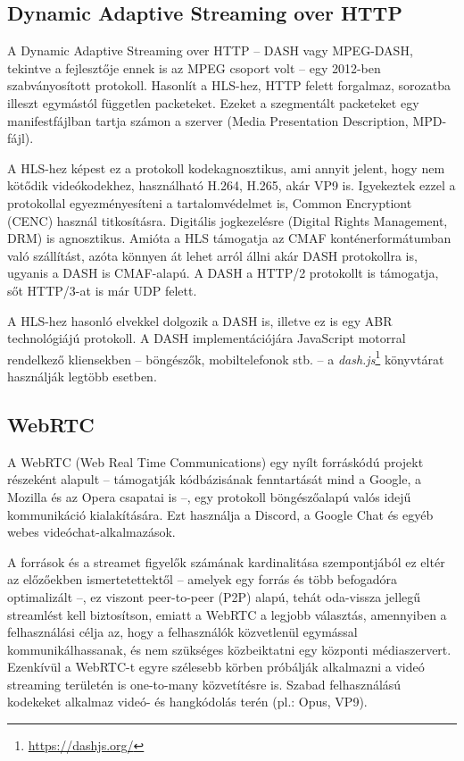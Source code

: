 \subsection{Dynamic Adaptive Streaming over HTTP}

A Dynamic Adaptive Streaming over HTTP -- DASH vagy MPEG-DASH, tekintve a fejlesztője ennek is az MPEG csoport volt -- egy 2012-ben szabványosított protokoll. Hasonlít a HLS-hez, HTTP felett forgalmaz, sorozatba illeszt egymástól független packeteket. Ezeket a szegmentált packeteket egy manifestfájlban tartja számon a szerver (Media Presentation Description, MPD-fájl). \cite{Dash}

A HLS-hez képest ez a protokoll kodekagnosztikus, ami annyit jelent, hogy nem kötődik videókodekhez, használható H.264, H.265, akár VP9 is. \cite{DashIso} Igyekeztek ezzel a protokollal egyezményesíteni a tartalomvédelmet is, Common Encryptiont (CENC) használ titkosításra. Digitális jogkezelésre (Digital Rights Management, DRM) is agnosztikus. Amióta a HLS támogatja az CMAF konténerformátumban való szállítást, azóta könnyen át lehet arról állni akár DASH protokollra is, ugyanis a DASH is CMAF-alapú. A DASH a HTTP/2 protokollt is támogatja, sőt HTTP/3-at is már UDP felett.

A HLS-hez hasonló elvekkel dolgozik a DASH is, illetve ez is egy ABR technológiájú protokoll. A DASH implementációjára JavaScript motorral rendelkező kliensekben -- böngészők, mobiltelefonok stb. -- a \emph{dash.js}\footnote{\url{https://dashjs.org/}} könyvtárat használják legtöbb esetben.

\subsection{WebRTC}

A WebRTC (Web Real Time Communications) egy nyílt forráskódú projekt részeként alapult -- támogatják kódbázisának fenntartását mind a Google, a Mozilla és az Opera csapatai is --, egy protokoll böngészőalapú valós idejű kommunikáció kialakítására. Ezt használja a Discord, a Google Chat és egyéb webes videóchat-alkalmazások. \cite{StreamingHistory}

A források és a streamet figyelők számának kardinalitása szempontjából ez eltér az előzőekben ismertetettektől -- amelyek egy forrás és több befogadóra optimalizált --, ez viszont peer-to-peer (P2P) alapú, tehát oda-vissza jellegű streamlést kell biztosítson, emiatt a WebRTC a legjobb választás, amennyiben a felhasználási célja az, hogy a felhasználók közvetlenül egymással kommunikálhassanak, és nem szükséges közbeiktatni egy központi médiaszervert. Ezenkívül a WebRTC-t egyre szélesebb körben próbálják alkalmazni a videó streaming területén is one-to-many közvetítésre is. Szabad felhasználású kodekeket alkalmaz videó- és hangkódolás terén (pl.: Opus, VP9). \cite{WebRTC}
